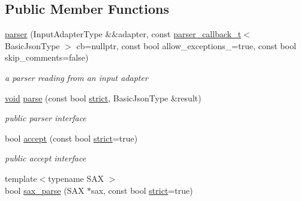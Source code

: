 \subsection*{Public Member Functions}
\begin{DoxyCompactItemize}
\item 
\hyperlink{classnlohmann_1_1detail_1_1parser_a33b852bf63cba58310d9c0d1242cfb12}{parser} (Input\+Adapter\+Type \&\&adapter, const \hyperlink{namespacenlohmann_1_1detail_a9980144ad77e50ae944d1fe797ceec08}{parser\+\_\+callback\+\_\+t}$<$ Basic\+Json\+Type $>$ cb=nullptr, const bool allow\+\_\+exceptions\+\_\+=true, const bool skip\+\_\+comments=false)
\begin{DoxyCompactList}\small\item\em a parser reading from an input adapter \end{DoxyCompactList}\item 
\hyperlink{namespacenlohmann_1_1detail_a59fca69799f6b9e366710cb9043aa77d}{void} \hyperlink{classnlohmann_1_1detail_1_1parser_a75fb9145ea85f1ad9cc14f61981e1111}{parse} (const bool \hyperlink{namespacenlohmann_1_1detail_a5a76b60b26dc8c47256a996d18d967dfa2133fd717402a7966ee88d06f9e0b792}{strict}, Basic\+Json\+Type \&result)
\begin{DoxyCompactList}\small\item\em public parser interface \end{DoxyCompactList}\item 
bool \hyperlink{classnlohmann_1_1detail_1_1parser_a39784a586867c05388cb0adca0fd72b5}{accept} (const bool \hyperlink{namespacenlohmann_1_1detail_a5a76b60b26dc8c47256a996d18d967dfa2133fd717402a7966ee88d06f9e0b792}{strict}=true)
\begin{DoxyCompactList}\small\item\em public accept interface \end{DoxyCompactList}\item 
{\footnotesize template$<$typename S\+AX $>$ }\\bool \hyperlink{classnlohmann_1_1detail_1_1parser_a073b8313a5194aac3a7d5da0d935788c}{sax\+\_\+parse} (S\+AX $\ast$sax, const bool \hyperlink{namespacenlohmann_1_1detail_a5a76b60b26dc8c47256a996d18d967dfa2133fd717402a7966ee88d06f9e0b792}{strict}=true)
\end{DoxyCompactItemize}
